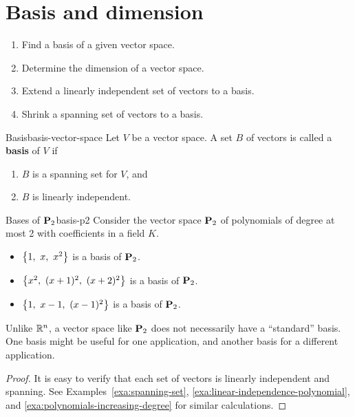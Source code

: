 \section{Basis and dimension}

\begin{outcome}
  \begin{enumerate}
  \item Find a basis of a given vector space.
  \item Determine the dimension of a vector space.
  \item Extend a linearly independent set of vectors to a basis.
  \item Shrink a spanning set of vectors to a basis.
  \end{enumerate}
\end{outcome}

\begin{definition}{Basis}{basis-vector-space}
  Let $V$ be a vector space. A set $B$ of vectors is called a
  \textbf{basis}%
   of $V$ if
  \begin{enumerate}
  \item $B$ is a spanning set for $V$, and
  \item $B$ is linearly independent.
  \end{enumerate}
\end{definition}

\begin{example}{Bases of $\mathbf{P}_2$}{basis-p2}
  Consider the vector space $\mathbf{P}_2$ of polynomials of degree at most
  2 with coefficients in a field $K$.%
  \begin{itemize}
  \item $\left\{1,~ x,~ x^2\right\}$ is a basis of $\mathbf{P}_2$.
  \item $\left\{x^2,~ (x+1)^2,~ (x+2)^2\right\}$ is a basis of $\mathbf{P}_2$.
  \item $\left\{1,~ x-1,~ (x-1)^2\right\}$ is a basis of $\mathbf{P}_2$.
  \end{itemize}
  Unlike $\mathbb{R}^n$, a vector space like $\mathbf{P}_2$ does not
  necessarily have a ``standard'' basis. One basis might be useful for
  one application, and another basis for a different application.
\end{example}

\begin{proof}
  It is easy to verify that each set of vectors is linearly
  independent and spanning. See Examples~\ref{exa:spanning-set},
  {\ref{exa:linear-independence-polynomial}}, and
  {\ref{exa:polynomials-increasing-degree}} for similar calculations.
\end{proof}


